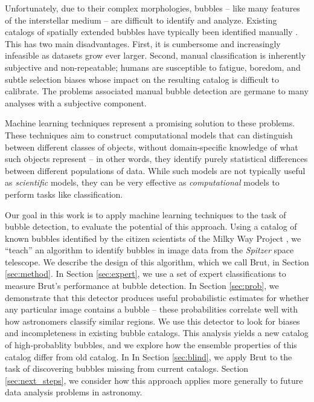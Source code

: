 \documentclass[preprint]{aastex}
\begin{document}
Unfortunately, due to their complex morphologies, bubbles -- like many features of the interstellar medium -- are difficult to identify and analyze. Existing catalogs of spatially extended bubbles have typically been identified manually \citep{Churchwell06, Churchwell07, Simpson12, Helfand06}. This has two main disadvantages. First, it is cumbersome and increasingly infeasible as datasets grow ever larger. Second, manual classification is inherently subjective and non-repeatable; humans are susceptible to fatigue, boredom, and subtle selection biases whose impact on the resulting catalog is difficult to calibrate. The problems associated manual bubble detection are germane to many analyses with a subjective component. 

Machine learning techniques represent a promising solution to these problems. These techniques aim to construct computational models that can distinguish between different classes of objects, without domain-specific knowledge of what such objects represent -- in other words, they identify purely statistical differences between different populations of data. While such models are not typically useful as \textit{scientific} models, they can be very effective as \textit{computational} models to perform tasks like classification. 

Our goal in this work is to apply machine learning techniques to the task of bubble detection, to evaluate the potential of this approach. Using a catalog of known bubbles identified by the citizen scientists of the Milky Way Project \citep{Simpson12}, we ``teach'' an algorithm to identify bubbles in image data from the \textit{Spitzer} space telescope. We describe the design of this algorithm, which we call Brut, in Section \ref{sec:method}. In Section \ref{sec:expert}, we use a set of expert classifications to measure Brut's performance at bubble detection. In Section \ref{sec:prob}, we demonstrate that this detector produces useful probabilistic estimates for whether any particular image contains a bubble -- these probabilities correlate well with how astronomers classify similar regions. We use this detector to look for biases and incompleteness in existing bubble catalogs. This analysis yields a new catalog of high-probablity bubbles, and we explore how the ensemble properties of this catalog differ from old catalog. In In Section \ref{sec:blind}, we apply Brut to the task of discovering bubbles missing from current catalogs. Section \ref{sec:next_steps}, we consider how this approach applies more generally to future data analysis problems in astronomy.
\end{document}
